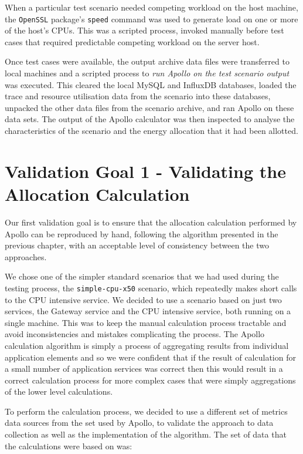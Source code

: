 When a particular test scenario needed competing workload on the host machine, the \texttt{OpenSSL} package's \texttt{speed} command was used to generate load on one or more of the host's CPUs.  This was a scripted process, invoked manually before test cases that required predictable competing workload on the server host.

Once test cases were available, the output archive data files were transferred to local machines and a scripted process to \emph{run Apollo on the test scenario output} was executed. This cleared the local MySQL and InfluxDB databases, loaded the trace and resource utilisation data from the scenario into these databases, unpacked the other data files from the scenario archive, and ran Apollo on these data sets.  The output of the Apollo calculator was then inspected to analyse the characteristics of the scenario and the energy allocation that it had been allotted.


\section{Validation Goal 1 - Validating the Allocation Calculation}
\label{sec:validatingcalculation}

Our first validation goal is to ensure that the allocation calculation performed by Apollo can be reproduced by hand, following the algorithm presented in the previous chapter, with an acceptable level of consistency between the two approaches.

We chose one of the simpler standard scenarios that we had used during the testing process, the \texttt{simple-cpu-x50} scenario, which repeatedly makes short calls to the CPU intensive service.  We decided to use a scenario based on just two services, the Gateway service and the CPU intensive service, both running on a single machine.  This was to keep the manual calculation process tractable and avoid inconsistencies and mistakes complicating the process.  The Apollo calculation algorithm is simply a process of aggregating results from individual application elements and so we were confident that if the result of calculation for a small number of application services was correct then this would result in a correct calculation process for more complex cases that were simply aggregations of the lower level calculations.

To perform the calculation process, we decided to use a different set of metrics data sources from the set used by Apollo, to validate the approach to data collection as well as the implementation of the algorithm.  The set of data that the calculations were based on was:


